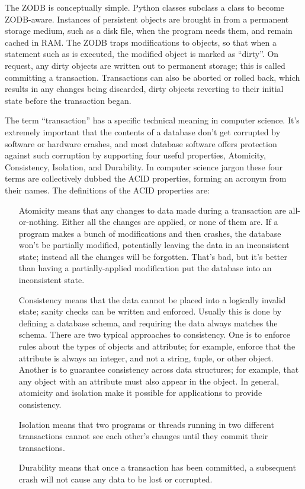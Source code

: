 The ZODB is conceptually simple.  Python classes subclass a 
 class to become ZODB-aware. 
Instances of persistent objects are brought in from a permanent
storage medium, such as a disk file, when the program needs them, and
remain cached in RAM.  The ZODB traps modifications to objects, so
that when a statement such as  is executed, the
modified object is marked as ``dirty''.  On request, any dirty objects
are written out to permanent storage; this is called committing a
transaction.  Transactions can also be aborted or rolled back, which
results in any changes being discarded, dirty objects reverting to
their initial state before the transaction began.

The term ``transaction'' has a specific technical meaning in computer
science.  It's extremely important that the contents of a database
don't get corrupted by software or hardware crashes, and most database
software offers protection against such corruption by supporting four
useful properties, Atomicity, Consistency, Isolation, and Durability.
In computer science jargon these four terms are collectively dubbed
the ACID properties, forming an acronym from their names.  The
definitions of the ACID properties are:

\begin{itemize}

\item[Atomicity] means that any changes to data made during a transaction 
are all-or-nothing.  Either all the changes are applied, or none of
them are.  If a program makes a bunch of modifications and then
crashes, the database won't be partially modified, potentially leaving
the data in an inconsistent state; instead all the changes will be
forgotten.  That's bad, but it's better than having a
partially-applied modification put the database into an inconsistent
state.

\item[Consistency] means that the data cannot be placed into a
logically invalid state; sanity checks can be written and enforced.
Usually this is done by defining a database schema, and requiring
the data always matches the schema.  There are two typical
approaches to consistency.  One is to enforce rules about the types
of objects and attribute; for example, enforce that the
 attribute is always an integer, and not a
string, tuple, or other object.  Another is to guarantee consistency
across data structures; for example, that any object with an
 attribute must also appear in the
 object.  In general, atomicity and isolation make
it possible for applications to provide consistency.

\item[Isolation] means that two programs or threads running in two
 different transactions cannot see each other's changes until they
 commit their transactions.

\item[Durability] means that once a transaction has been committed,
a subsequent crash will not cause any data to be lost or corrupted.

\end{itemize}

